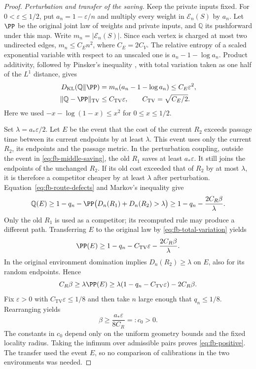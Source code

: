 \begin{proof}
\emph{Perturbation and transfer of the saving.}
Keep the private inputs fixed.  For $0<\varepsilon\le1/2$, put
$a_n=1-\varepsilon/n$ and multiply every weight in
$\mathcal E_n(S)$ by $a_n$.  Let $\PP $ be the original joint
law of weights and private inputs, and $\mathbb Q$ its pushforward
under this map.  Write $m_n=|\mathcal E_n(S)|$.  Since each vertex
is charged at most two undirected edges,
$m_n\le C_E n^2$, where $C_E=2C_V$.  The relative entropy of a scaled
exponential variable with respect to an unscaled one is
$a_n-1-\log a_n$.  Product additivity, followed by Pinsker's
inequality \cite[Theorem~31, order one]{vanErvenHarremoes2014}, with total
variation taken as one half of the $L^1$ distance, gives
\begin{equation}
 \begin{split}
 D_{\mathrm{KL}}(\mathbb Q\Vert\PP )
 &=m_n(a_n-1-\log a_n)\le C_E\varepsilon^2,\\
 \|\mathbb Q-\PP \|_{\mathrm{TV}}
 &\le C_{\mathrm{TV}}\varepsilon,
 \qquad C_{\mathrm{TV}}=\sqrt{C_E/2}.
 \end{split}
 \label{eq:fb-total-variation}
\end{equation}
Here we used $-x-\log(1-x)\le x^2$ for $0\le x\le1/2$.

Set $\lambda=a_*\varepsilon/2$.  Let $E$ be the event that the cost
of the current $R_2$ exceeds passage time between its current endpoints
by at least $\lambda$.  This event uses only the current $R_2$, its
endpoints and the passage metric.  In the perturbation coupling,
outside the event in \eqref{eq:fb-middle-saving}, the old $R_1$ saves at least
$a_*\varepsilon$.  It still joins the endpoints of the unchanged
$R_2$.  If its old cost exceeded that of $R_2$ by at most $\lambda$,
it is therefore a competitor cheaper by at least $\lambda$ after
perturbation.  Equation~\eqref{eq:fb-route-defects} and Markov's
inequality give
\[
 \mathbb Q(E)
 \ge1-q_n-
 \PP \bigl(D_n(R_1)+D_n(R_2)>\lambda\bigr)
 \ge1-q_n-\frac{2C_R\beta}{\lambda}.
\]
Only the old $R_1$ is used as a competitor; its recomputed rule may
produce a different path.  Transferring $E$ to the original law by
\eqref{eq:fb-total-variation} yields
\[
 \PP (E)
 \ge1-q_n-C_{\mathrm{TV}}\varepsilon
       -\frac{2C_R\beta}{\lambda}.
\]
In the original environment domination implies
$D_n(R_2)\ge\lambda$ on $E$, also for its random endpoints.
Hence
\[
 C_R\beta\ge\lambda\PP (E)
 \ge\lambda(1-q_n-C_{\mathrm{TV}}\varepsilon)-2C_R\beta.
\]
Fix $\varepsilon>0$ with $C_{\mathrm{TV}}\varepsilon\le1/8$ and
then take $n$ large enough that $q_n\le1/8$.  Rearranging yields
\[
 \beta\ge \frac{a_*\varepsilon}{8C_R}=:c_0>0.
\]
The constants in $c_0$ depend only on the uniform geometry bounds
and the fixed locality radius.  Taking the infimum over admissible
pairs proves \eqref{eq:fb-positive}.  The transfer used the event $E$,
so no comparison of calibrations in the two environments was needed.
\end{proof}

